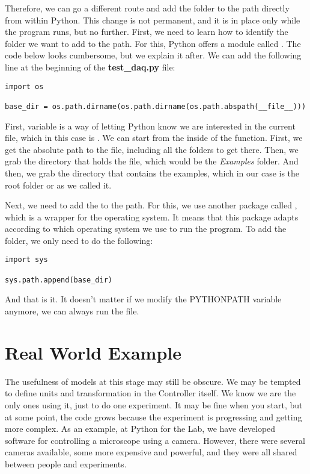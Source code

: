 Therefore, we can go a different route and add the folder to the path directly from within Python. This change is not permanent, and it is in place only while the program runs, but no further. First, we need to learn how to identify the folder we want to add to the path. For this, Python offers a module called . The code below looks cumbersome, but we explain it after. We can add the following line at the beginning of the \textbf{test\_daq.py} file:

\begin{verbatim}
import os

base_dir = os.path.dirname(os.path.dirname(os.path.abspath(__file__)))
\end{verbatim}

First,  variable is a way of letting Python know we are interested in the current file, which in this case is . We can start from the inside of the function. First, we get the absolute path to the file, including all the folders to get there. Then, we grab the directory that holds the file, which would be the \emph{Examples} folder. And then, we grab the directory that contains the examples, which in our case is the root folder or  as we called it.

Next, we need to add the  to the path. For this, we use another package called , which is a wrapper for the operating system. It means that this package adapts according to which operating system we use to run the program. To add the folder, we only need to do the following:

\begin{verbatim}
import sys

sys.path.append(base_dir)
\end{verbatim}

And that is it. It doesn't matter if we modify the PYTHONPATH variable anymore, we can always run the  file.


\section{Real World Example}\label{sec:real-world-model}
The usefulness of models at this stage may still be obscure. We may be tempted to define units and transformation in the Controller itself. We know we are the only ones using it, just to do one experiment. It may be fine when you start, but at some point, the code grows because the experiment is progressing and getting more complex. As an example, at Python for the Lab, we have developed software for controlling a microscope using a camera. However, there were several cameras available, some more expensive and powerful, and they were all shared between people and experiments.

